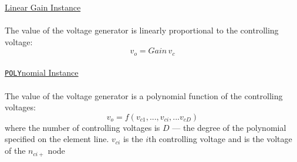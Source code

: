 \noindent\underline{Linear Gain Instance}
\\[0.1in]\hspace*{\fill}\\[0.1in]
The value of the voltage generator is linearly proportional to the
controlling voltage:
\begin{equation}
v_o = Gain\,v_c
\end{equation}
\\[0.2in]\noindent\underline{{\tt POLY}nomial Instance}
\\[0.1in]\hspace*{\fill}\\[0.1in]
The value of the voltage generator is a polynomial function of the
controlling voltages:
\begin{equation}
v_o = f(v_{c1}, ...,  v_{ci}, ...  v_{cD})
\end{equation}
where the number of controlling voltages is $D$ --- the degree of
the polynomial specified on the element line. $v_{ci}$ is the
$i$th controlling voltage and is the voltage of the $n_{ci+}$ node

